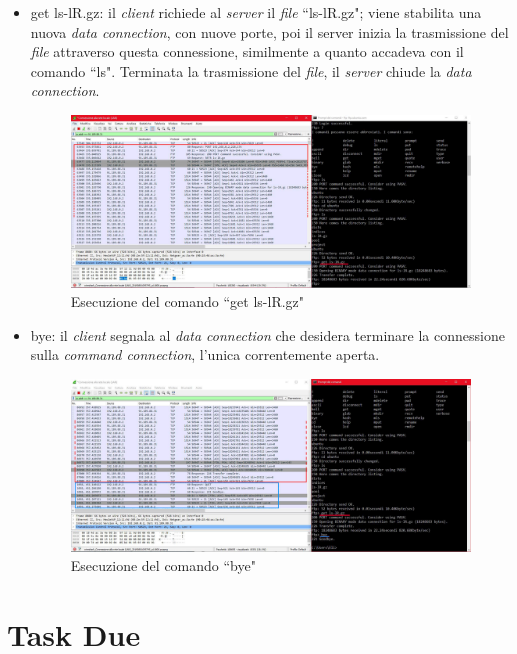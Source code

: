 \documentclass[a4paper, 12pt]{report}
\begin{document}
\begin{itemize}
    \item get ls-lR.gz: il \textit{client} richiede al \textit{server} il \textit{file} ``ls-lR.gz"; viene stabilita una nuova \textit{data connection}, con nuove porte, poi il server inizia la trasmissione
    del \textit{file} attraverso questa connessione, similmente a quanto accadeva con il comando ``ls". Terminata la trasmissione del \textit{file}, il \textit{server} chiude la \textit{data connection}.

    \begin{figure}[H]
        \centering
        \includegraphics[width=\linewidth]{images/image1_5.png}
        \caption{Esecuzione del comando ``get ls-lR.gz"}
    \end{figure}

    \item bye: il \textit{client} segnala al \textit{data connection} che desidera terminare la connessione sulla \textit{command connection}, l’unica correntemente aperta.
    
    \begin{figure}[H]
        \centering
        \includegraphics[width=\linewidth]{images/image1_6.png}
        \caption{Esecuzione del comando ``bye"}
    \end{figure}
\end{itemize}

\chapter{Task Due}
\end{document}
